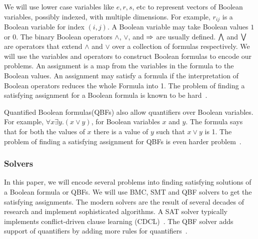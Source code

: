 \noindent We will use lower case variables like $e,r,s$, etc to represent vectors of
Boolean variables, possibly indexed, with multiple dimensions.
%
For example, $r_{ij}$ is a Boolean variable for index $(i,j)$.
%
%
A Boolean variable may take Boolean values $1$ or $0$.
%
The binary Boolean operators $\land$, $\lor$, and $\Rightarrow$ are usually defined.
%
$\bigwedge$ and $\bigvee$ are operators that extend $\land$ and $\lor$ over a collection of formulas respectively.
%
We will use the variables and operators to construct Boolean formulas to
encode our problems.
%
An assignment is a map from the variables in the formula to the Boolean values.
%
An assignment may satisfy a formula if the interpretation of Boolean operators
reduces the whole Formula into 1.
%
The problem of finding a satisfying assignment for a Boolean formula is known to be hard~\cite{cook1971complexity}.
%

Quantified Boolean formulas(QBFs) also allow quantifiers over Boolean variables.
%
For example, $\forall x \exists y. (x \lor y)$, for Boolean variables $x$ and $y$.
%
The formula says that for both the values of $x$ there is a value of $y$
such that $x \lor y$ is 1.
%
The problem of finding a satisfying assignment for QBFs is even harder problem~\cite{stockmeyer1973word, arora2009computational}.\\
%

\subsubsection{Solvers}
In this paper, we will encode several problems into finding satisfying
solutions of a Boolean formula or QBFs.
%
We will use BMC, SMT and QBF solvers to get the satisfying assignments.
%
The modern solvers are the result of several decades of research
and implement sophisticated algorithms.
%
A SAT solver typically implements conflict-driven clause learning (CDCL)~\cite{biere2009conflict}.
The QBF solver adds support of quantifiers by adding more rules for quantifiers~\cite{buning2009theory}.

%
%

